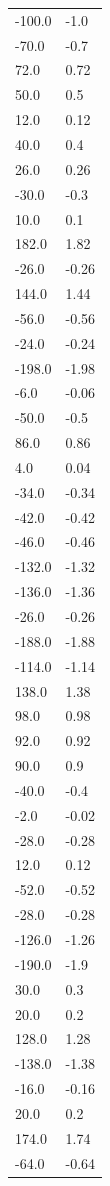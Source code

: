 \begin{longtable}{ll}
-100.0 & -1.0 \\
-70.0 & -0.7 \\
72.0 & 0.72 \\
50.0 & 0.5 \\
12.0 & 0.12 \\
40.0 & 0.4 \\
26.0 & 0.26 \\
-30.0 & -0.3 \\
10.0 & 0.1 \\
182.0 & 1.82 \\
-26.0 & -0.26 \\
144.0 & 1.44 \\
-56.0 & -0.56 \\
-24.0 & -0.24 \\
-198.0 & -1.98 \\
-6.0 & -0.06 \\
-50.0 & -0.5 \\
86.0 & 0.86 \\
4.0 & 0.04 \\
-34.0 & -0.34 \\
-42.0 & -0.42 \\
-46.0 & -0.46 \\
-132.0 & -1.32 \\
-136.0 & -1.36 \\
-26.0 & -0.26 \\
-188.0 & -1.88 \\
-114.0 & -1.14 \\
138.0 & 1.38 \\
98.0 & 0.98 \\
92.0 & 0.92 \\
90.0 & 0.9 \\
-40.0 & -0.4 \\
-2.0 & -0.02 \\
-28.0 & -0.28 \\
12.0 & 0.12 \\
-52.0 & -0.52 \\
-28.0 & -0.28 \\
-126.0 & -1.26 \\
-190.0 & -1.9 \\
30.0 & 0.3 \\
20.0 & 0.2 \\
128.0 & 1.28 \\
-138.0 & -1.38 \\
-16.0 & -0.16 \\
20.0 & 0.2 \\
174.0 & 1.74 \\
-64.0 & -0.64 \\

\end{longtable}
